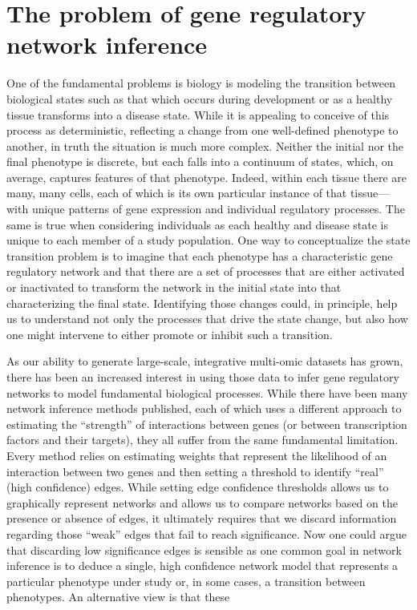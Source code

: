 \documentclass[english]{article}
\begin{document}
\section*{The problem of gene regulatory network inference }

One of the fundamental problems is biology is modeling the transition
between biological states such as that which occurs during development
or as a healthy tissue transforms into a disease state. While it is
appealing to conceive of this process as deterministic, reflecting
a change from one well-defined phenotype to another, in truth the
situation is much more complex. Neither the initial nor the final
phenotype is discrete, but each falls into a continuum of states,
which, on average, captures features of that phenotype. Indeed, within
each tissue there are many, many cells, each of which is its own particular
instance of that tissue—with unique patterns of gene expression and
individual regulatory processes. The same is true when considering
individuals as each healthy and disease state is unique to each member
of a study population. One way to conceptualize the state transition
problem is to imagine that each phenotype has a characteristic gene
regulatory network and that there are a set of processes that are
either activated or inactivated to transform the network in the initial
state into that characterizing the final state. Identifying those
changes could, in principle, help us to understand not only the processes
that drive the state change, but also how one might intervene to either
promote or inhibit such a transition.

As our ability to generate large-scale, integrative multi-omic datasets
has grown, there has been an increased interest in using those data
to infer gene regulatory networks to model fundamental biological
processes. While there have been many network inference methods published,
each of which uses a different approach to estimating the “strength”
of interactions between genes (or between transcription factors and
their targets), they all suffer from the same fundamental limitation.
Every method relies on estimating weights that represent the likelihood
of an interaction between two genes and then setting a threshold to
identify “real” (high confidence) edges. While setting edge confidence
thresholds allows us to graphically represent networks and allows
us to compare networks based on the presence or absence of edges,
it ultimately requires that we discard information regarding those
“weak” edges that fail to reach significance. Now one could argue
that discarding low significance edges is sensible as one common goal
in network inference is to deduce a single, high confidence network
model that represents a particular phenotype under study or, in some
cases, a transition between phenotypes. An alternative view is that
these 
\end{document}
